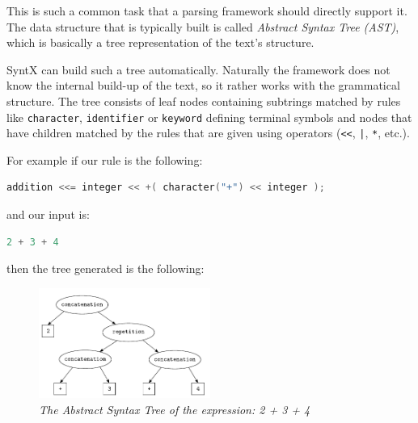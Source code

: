 \documentclass[12pt]{article}
\begin{document}
This is such a common task that a parsing framework should directly support it. The data structure that is
typically built is called \emph{Abstract Syntax Tree (AST)}, which is basically a tree representation of
the text's structure.

SyntX can build such a tree automatically. Naturally the framework does not know the internal build-up of the
text, so it rather works with the grammatical structure. The tree consists of leaf nodes containing subtrings
matched by rules like \texttt{character}, \texttt{identifier} or \texttt{keyword} defining terminal symbols
and nodes that have children matched by the rules that are given using operators (\texttt{<<}, \texttt{|},
\texttt{*}, etc.).

For example if our rule is the following:

\begin{center}
	\begin{minipage}[h]{0.7\textwidth}
		\begin{lstlisting}[language=C++, breaklines=true]
addition <<= integer << +( character("+") << integer );
		\end{lstlisting}
	\end{minipage}
\end{center}

and our input is:

\begin{center}
	\begin{minipage}[h]{0.2\textwidth}
		\begin{lstlisting}[language=C++, breaklines=true]
2 + 3 + 4
		\end{lstlisting}
	\end{minipage}
\end{center}

then the tree generated is the following:

\begin{figure}[h!]
	\centering
		\includegraphics[width=0.5\textwidth]{ast}
		\caption{\emph{The Abstract Syntax Tree of the expression: 2 + 3 + 4}}
		\label{fig:ast}
\end{figure}
\end{document}
